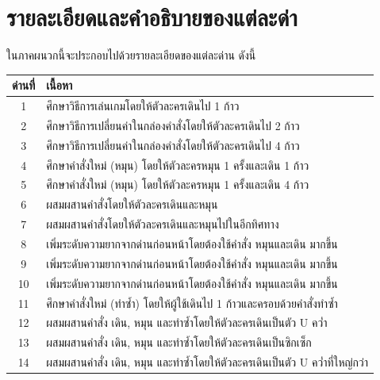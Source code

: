 \chapter{รายละเอียดและคำอธิบายของแต่ละด่า}
ในภาคผนวกนี้จะประกอบไปด้วยรายละเอียดของแต่ละด่าน ดังนี้
\begin{center}
    \begin{table}[H]
        \begin{center}
            \begin{tabularx}{\textwidth}{|c | X|} 
             \hline
             ด่านที่ & เนื้อหา\\ [0.5ex] 
             \hline\hline
             1 &  ศึกษาวิธีการเล่นเกมโดยให้ตัวละครเดินไป 1 ก้าว \\ 
             \hline
             2 &  ศึกษาวิธีการเปลี่ยนค่าในกล่องคำสั่งโดยให้ตัวละครเดินไป 2 ก้าว \\ 
             \hline
             3 &  ศึกษาวิธีการเปลี่ยนค่าในกล่องคำสั่งโดยให้ตัวละครเดินไป 4 ก้าว \\ 
             \hline
             4 &  ศึกษาคำสั่งใหม่ (หมุน) โดยให้ตัวละครหมุน 1 ครั้งและเดิน 1 ก้าว \\ 
             \hline
             5 &  ศึกษาคำสั่งใหม่ (หมุน) โดยให้ตัวละครหมุน 1 ครั้งและเดิน 4 ก้าว \\ 
             \hline
             6 &  ผสมผสานคำสั่งโดยให้ตัวละครเดินและหมุน \\ 
             \hline
             7 &  ผสมผสานคำสั่งโดยให้ตัวละครเดินและหมุนไปในอีกทิศทาง \\ 
             \hline
             8 &  เพิ่มระดับความยากจากด่านก่อนหน้าโดยต้องใช้คำสั่ง หมุนและเดิน มากขึ้น \\ 
             \hline
             9 &  เพิ่มระดับความยากจากด่านก่อนหน้าโดยต้องใช้คำสั่ง หมุนและเดิน มากขึ้น \\ 
             \hline
             10 &  เพิ่มระดับความยากจากด่านก่อนหน้าโดยต้องใช้คำสั่ง หมุนและเดิน มากขึ้น \\ 
             \hline
             11 &  ศึกษาคำสั่งใหม่ (ทำซ้ำ) โดยให้ผู้ใช้เดินไป 1 ก้าวและครอบด้วยคำสั่งทำซ้ำ \\ 
             \hline
             12 &  ผสมผสานคำสั่ง เดิน, หมุน และทำซ้ำโดยให้ตัวละครเดินเป็นตัว U คว่ำ \\ 
             \hline
             13 &  ผสมผสานคำสั่ง เดิน, หมุน และทำซ้ำโดยให้ตัวละครเดินเป็นซิกเซ็ก \\ 
             \hline
             14 &  ผสมผสานคำสั่ง เดิน, หมุน และทำซ้ำโดยให้ตัวละครเดินเป็นตัว U คว่ำที่ใหญ่กว่า \\ 

\end{tabularx}
\end{center}
\end{table}
\end{center}
